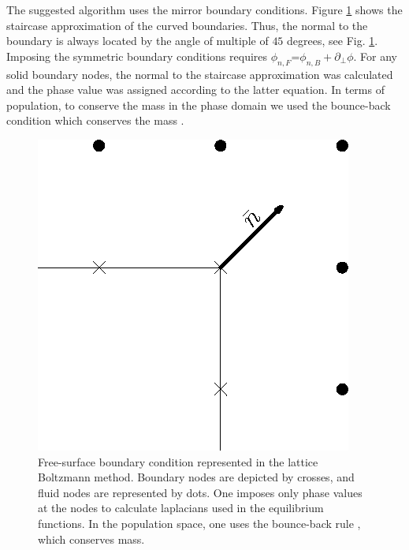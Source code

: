 \documentclass{article}
\begin{document}
The suggested algorithm uses the mirror boundary conditions. Figure \ref{fig:free:surface} shows the staircase approximation of the curved boundaries. 
Thus, the normal to the boundary is always located by the angle of multiple of $45$ degrees, see Fig. \ref{fig:free:surface}.  Imposing the
symmetric boundary conditions requires $\phi_{n,F}$=$\phi_{n,B}+\partial_{\perp} \phi$. For any solid boundary nodes, the normal to the staircase approximation was calculated and the phase value was assigned according to the latter equation.  In terms of population, to conserve the mass in the phase domain we used the bounce-back condition which conserves the mass \cite{yu}.  


\begin{figure}
\includegraphics[width=\textwidth]{Figures/free_surface.eps}
\caption{Free-surface boundary condition represented in the lattice Boltzmann method. 
Boundary nodes are depicted by crosses, and fluid nodes are represented by dots. One imposes only phase values at the nodes to calculate laplacians used in the equilibrium functions. In the population space, one uses the bounce-back rule \cite{yu}, which conserves mass.
\label{fig:free:surface}}
\end{figure}
\end{document}
